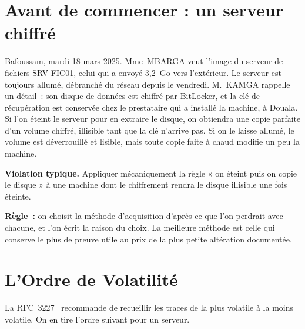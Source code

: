 \bigskip

\section*{Avant de commencer : un serveur chiffré}

Bafoussam, mardi 18 mars 2025. Mme~MBARGA veut l'image du serveur de
fichiers SRV-FIC01, celui qui a envoyé 3,2~Go vers l'extérieur. Le serveur
est toujours allumé, débranché du réseau depuis le vendredi. M.~KAMGA
rappelle un détail~: son disque de données est chiffré par BitLocker, et la
clé de récupération est conservée chez le prestataire qui a installé la
machine, à Douala. Si l'on éteint le serveur pour en extraire le disque, on
obtiendra une copie parfaite d'un volume chiffré, illisible tant que la clé
n'arrive pas. Si on le laisse allumé, le volume est déverrouillé et lisible,
mais toute copie faite à chaud modifie un peu la machine.

\begin{boxalert}
\textbf{Violation typique.} Appliquer mécaniquement la règle « on éteint
puis on copie le disque » à une machine dont le chiffrement rendra le disque
illisible une fois éteinte.

\smallskip
\textbf{Règle~:} on choisit la méthode d'acquisition d'après ce que l'on
perdrait avec chacune, et l'on écrit la raison du choix. La meilleure
méthode est celle qui conserve le plus de preuve utile au prix de la plus
petite altération documentée.
\end{boxalert}

\separateur

\section{L'Ordre de Volatilité}
\label{sec:c03-volatilite}

La RFC~3227~\cite{rfc3227} recommande de recueillir les traces de la plus
volatile à la moins volatile. On en tire l'ordre suivant pour un serveur.


